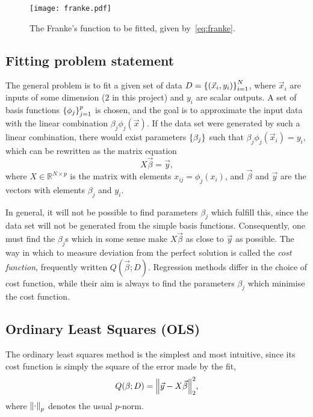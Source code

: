 \documentclass[11pt,british,a4paper]{article}
\numberwithin{equation}{section}
\begin{document}
\begin{figure}[H]
    \centering
    \texttt{[image: franke.pdf]}
    \caption{The Franke's function to be fitted, given by~\vref{eq:franke}.}\label{fig:franke}
\end{figure}

\subsection{Fitting problem statement}
The general problem is to fit a given set of data \(D=\qty{(\vec{x}_i,y_i)}_{i=1}^N\), where \(\vec{x}_i\) are inputs of some dimension (\(2\) in this project) and \(y_i\) are scalar outputs.
A set of basis functions \(\qty{\phi_j}_{j=1}^p\) is chosen, and the goal is to approximate the input data with the linear combination \(\beta_j \phi_j(\vec{x})\).
If the data set were generated by such a linear combination, there would exist parameters \(\qty{\beta_j}\) such that \(\beta_j\phi_j(\vec{x}_i)=y_i\), which can be rewritten as the matrix equation
\begin{equation}
    X\vec{\beta} = \vec{y},
\end{equation}
where \(X\in\mathbb{R}^{N\times p}\) is the matrix with elements \(x_{ij}=\phi_j(x_i)\), and \(\vec{\beta}\) and \(\vec{y}\) are the vectors with elements \(\beta_j\) and \(y_i\).

In general, it will not be possible to find parameters \(\beta_j\) which fulfill this, since the data set will not be generated from the simple basis functions.
Consequently, one must find the \(\beta_j\)s which in some sense make \(X\vec{\beta}\) as close to \(\vec{y}\) as possible.
The way in which to measure deviation from the perfect solution is called the \emph{cost function}, frequently written \(Q(\vec{\beta};D)\).
Regression methods differ in the choice of cost function, while their aim is always to find the parameters \(\beta_j\) which minimise the cost function.

\subsection{Ordinary Least Squares (OLS)}
The ordinary least squares method is the simplest and most intuitive, since its cost function is simply the square of the error made by the fit,
\begin{equation}
    Q(\beta;D) = \norm{\vec{y}-X\vec{\beta}}_2^2,
\end{equation}
where \(\norm{\cdot}_p\) denotes the usual \(p\)-norm.
\end{document}
